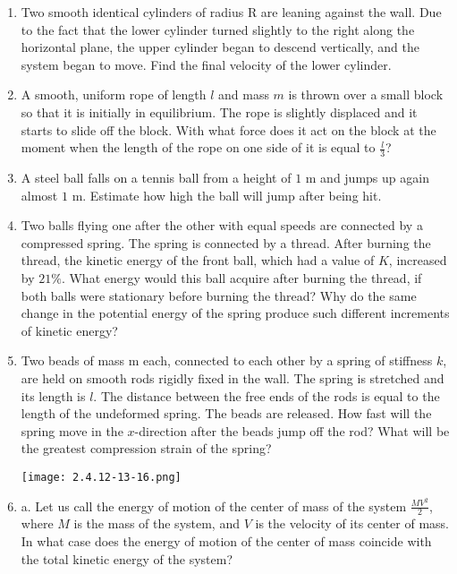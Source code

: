 \documentclass{article}
\begin{document}
\begin{enumerate}[label=2.4.\arabic*]
\item Two smooth identical cylinders of radius R are leaning against the wall. Due to the fact that the lower cylinder turned slightly to the right along the horizontal plane, the upper cylinder began to descend vertically, and the system began to move. Find the final velocity of the lower cylinder.

\item A smooth, uniform rope of length $l$ and mass $m$ is thrown over a small block so that it is initially in equilibrium. The rope is slightly displaced and it starts to slide off the block. With what force does it act on the block at the moment when the length of the rope on one side of it is equal to $\frac{l}{3}$?

\item A steel ball falls on a tennis ball from a height of $1$ m and jumps up again almost $1$ m. Estimate how high the ball will jump after being hit.

\item Two balls flying one after the other with equal speeds are connected by a compressed spring. The spring is connected by a thread. After burning the thread, the kinetic energy of the front ball, which had a value of $K$, increased by $21 \%$. What energy would this ball acquire after burning the thread, if both balls were stationary before burning the thread? Why do the same change in the potential energy of the spring produce such different increments of kinetic energy?

\item Two beads of mass m each, connected to each other by a spring of stiffness $k$, are held on smooth rods rigidly fixed in the wall. The spring is stretched and its length is $l$. The distance between the free ends of the rods is equal to the length of the undeformed spring. The beads are released. How fast will the spring move in the $x$-direction after the beads jump off the rod? What will be the greatest compression strain of the spring?

\begin{center}
    \texttt{[image: 2.4.12-13-16.png]}
\end{center}


\item a. Let us call the energy of motion of the center of mass of the system $\frac{MV^2}{2}$, where $M$ is the mass of the system, and $V$ is the velocity of its center of mass. In what case does the energy of motion of the center of mass coincide with the total kinetic energy of the system? 


\end{enumerate}
\end{document}
